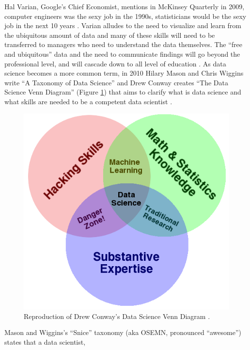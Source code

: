 \documentclass[010-intro.tex]{subfiles}
\begin{document}
    Hal Varian, Google's Chief Economist, mentions in McKinsey Quarterly in 2009,
    computer engineers was the sexy job in the 1990s,
    statisticians would be the sexy job in the next 10 years
    \cite{HalVarianHow2009}.
    Varian alludes to
    the need to visualize and learn from the ubiquitous amount of data and
    many of these skills will need to be transferred to managers who need to understand the data themselves.
    The ``free and ubiquitous'' data and the need to communicate findings will go beyond the professional level,
    and will cascade down to all level of education
    \cite{HalVarianHow2009}.
    As data science becomes a more common term,
    in 2010 Hilary Mason and Chris Wiggins write ``A Taxonomy of Data Science''
    \cite{masonTaxonomyDataScience2010}
    and
    Drew Conway creates ``The Data Science Venn Diagram'' (Figure \ref{fig:conway-venn})
    that aims to clarify what is data science and what skills are needed to be a competent data scientist
    \cite{conwayDataScienceVenn}.
    \begin{figure}[htb]
        \centering
        \includegraphics[scale=0.5]{figs/050-intro/Data_Science_VD}
        \caption[Drew Conway's Data Science Venn Diagram]{
        Reproduction of Drew Conway's Data Science Venn Diagram \cite{conwayDataScienceVenn}.
        }
        \label{fig:conway-venn}
    \end{figure}
    Mason and Wiggins's ``Snice'' taxonomy (aka OSEMN, pronounced ``awesome'') states that a data scientist,
\end{document}
